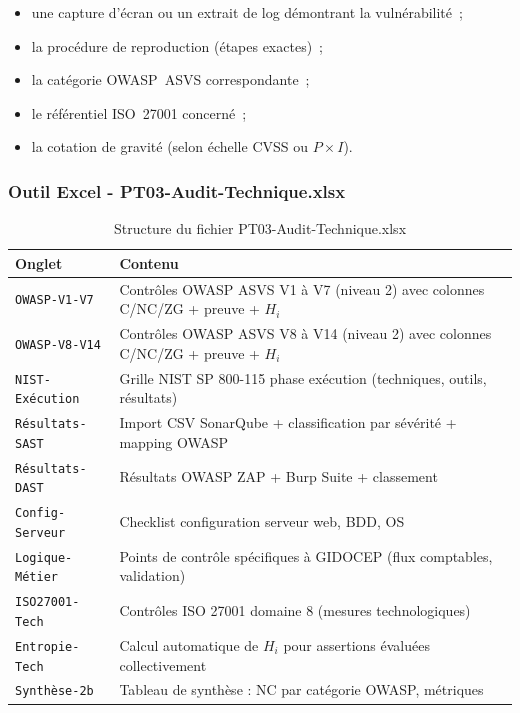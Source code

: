 \documentclass[12pt,a4paper,oneside]{report}
\begin{document}
\begin{itemize}[label={\color{gold}}, leftmargin=*, itemsep=2pt]
\item une capture d'\'ecran ou un extrait de log d\'emontrant la vuln\'erabilit\'e~;
\item la proc\'edure de reproduction (\'etapes exactes)~;
\item la cat\'egorie OWASP~ASVS correspondante~;
\item le r\'ef\'erentiel ISO~27001 concern\'e~;
\item la cotation de gravit\'e (selon \'echelle CVSS ou $P \times I$).
\end{itemize}

\subsubsection{Outil Excel - PT03-Audit-Technique.xlsx}

\begin{table}[H]
\centering\small
\caption{Structure du fichier PT03-Audit-Technique.xlsx}
\label{tab:pt03}
\begin{tabularx}{\textwidth}{p{4cm}X}
\toprule
\rowcolor{theadcolor}
\color{white}\textbf{Onglet} &
\color{white}\textbf{Contenu} \\
\midrule
\texttt{OWASP-V1-V7} & Contrôles OWASP ASVS V1 à V7 (niveau 2) avec colonnes C/NC/ZG + preuve + $H_i$ \\
\texttt{OWASP-V8-V14} & Contrôles OWASP ASVS V8 à V14 (niveau 2) avec colonnes C/NC/ZG + preuve + $H_i$ \\
\texttt{NIST-Exécution} & Grille NIST SP 800-115 phase exécution (techniques, outils, résultats) \\
\texttt{Résultats-SAST} & Import CSV SonarQube + classification par sévérité + mapping OWASP \\
\texttt{Résultats-DAST} & Résultats OWASP ZAP + Burp Suite + classement \\
\texttt{Config-Serveur} & Checklist configuration serveur web, BDD, OS \\
\texttt{Logique-Métier} & Points de contrôle spécifiques à GIDOCEP (flux comptables, validation) \\
\texttt{ISO27001-Tech} & Contrôles ISO 27001 domaine 8 (mesures technologiques) \\
\texttt{Entropie-Tech} & Calcul automatique de $H_i$ pour assertions évaluées collectivement \\
\texttt{Synthèse-2b} & Tableau de synthèse : NC par catégorie OWASP, métriques \\
\bottomrule
\end{tabularx}
\end{table}
\end{document}
